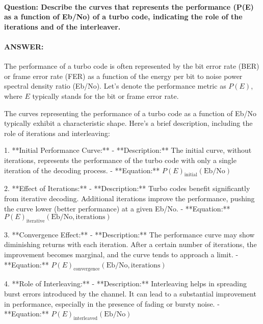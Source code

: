 \documentclass[colorlinks,11pt,a4paper,normalphoto,withhyper,ragged2e]{altareport}
\begin{document}
				
				
				
				\paragraph{Question: Describe the curves that represents the performance (P(E) as a function of Eb/No) of a turbo code, indicating the role of the iterations and of the interleaver.}
				\paragraph{ANSWER:}
				
				The performance of a turbo code is often represented by the bit error rate (BER) or frame error rate (FER) as a function of the energy per bit to noise power spectral density ratio (Eb/No). Let's denote the performance metric as \(P(E)\), where \(E\) typically stands for the bit or frame error rate.
				
				The curves representing the performance of a turbo code as a function of Eb/No typically exhibit a characteristic shape. Here's a brief description, including the role of iterations and interleaving:
				
				1. **Initial Performance Curve:**
				- **Description:** The initial curve, without iterations, represents the performance of the turbo code with only a single iteration of the decoding process.
				- **Equation:** \(P(E)_{\text{initial}}(\text{Eb/No})\)
				
				2. **Effect of Iterations:**
				- **Description:** Turbo codes benefit significantly from iterative decoding. Additional iterations improve the performance, pushing the curve lower (better performance) at a given Eb/No.
				- **Equation:** \(P(E)_{\text{iterative}}(\text{Eb/No}, \text{iterations})\)
				
				3. **Convergence Effect:**
				- **Description:** The performance curve may show diminishing returns with each iteration. After a certain number of iterations, the improvement becomes marginal, and the curve tends to approach a limit.
				- **Equation:** \(P(E)_{\text{convergence}}(\text{Eb/No}, \text{iterations})\)
				
				4. **Role of Interleaving:**
				- **Description:** Interleaving helps in spreading burst errors introduced by the channel. It can lead to a substantial improvement in performance, especially in the presence of fading or bursty noise.
				- **Equation:** \(P(E)_{\text{interleaved}}(\text{Eb/No})\)
				
\end{document}
